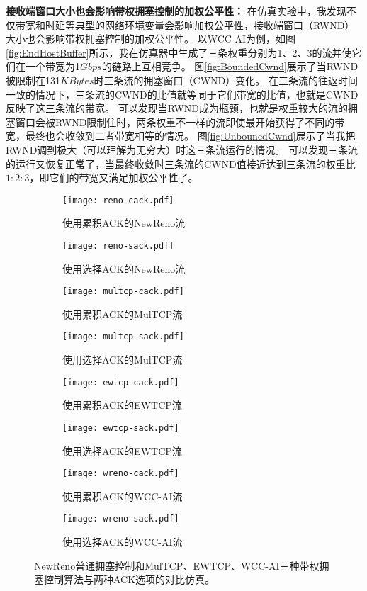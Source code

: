 \documentclass[winfonts]{njuthesis}
\begin{document}
\textbf{接收端窗口大小也会影响带权拥塞控制的加权公平性：}
在仿真实验中，我发现不仅带宽和时延等典型的网络环境变量会影响加权公平性，接收端窗口（RWND）大小也会影响带权拥塞控制的加权公平性。
以WCC-AI为例，如图\ref{fig:EndHostBuffer}所示，我在仿真器中生成了三条权重分别为1、2、3的流并使它们在一个带宽为1$Gbps$的链路上互相竞争。
图\ref{fig:BoundedCwnd}展示了当RWND被限制在131$KBytes$时三条流的拥塞窗口（CWND）变化。
在三条流的往返时间一致的情况下，三条流的CWND的比值就等同于它们带宽的比值，也就是CWND反映了这三条流的带宽。
可以发现当RWND成为瓶颈，也就是权重较大的流的拥塞窗口会被RWND限制住时，两条权重不一样的流即使最开始获得了不同的带宽，最终也会收敛到二者带宽相等的情况。
图\ref{fig:UnbounedCwnd}展示了当我把RWND调到极大（可以理解为无穷大）时这三条流运行的情况。
可以发现三条流的运行又恢复正常了，当最终收敛时三条流的CWND值接近达到三条流的权重比$1:2:3$，即它们的带宽又满足加权公平性了。

\begin{figure}[ht!]
	\begin{subfigure}{.5\textwidth}
    \centering
		\texttt{[image: reno-cack.pdf]}
    \label{fig:renoCack}
    \caption{使用累积ACK的NewReno流}
  \end{subfigure}
	\begin{subfigure}{.5\textwidth}
    \centering
		\texttt{[image: reno-sack.pdf]}
    \label{fig:renoSack}
    \caption{使用选择ACK的NewReno流}
  \end{subfigure}
	\begin{subfigure}{.5\textwidth}
    \centering
		\texttt{[image: multcp-cack.pdf]}
    \label{fig:multcpCack}
    \caption{使用累积ACK的MulTCP流}
  \end{subfigure}
	\begin{subfigure}{.5\textwidth}
    \centering
		\texttt{[image: multcp-sack.pdf]}
    \label{fig:multcpSack}
    \caption{使用选择ACK的MulTCP流}
  \end{subfigure}
	\begin{subfigure}{.5\textwidth}
    \centering
		\texttt{[image: ewtcp-cack.pdf]}
    \label{fig:ewtcpCack}
    \caption{使用累积ACK的EWTCP流}
  \end{subfigure}
	\begin{subfigure}{.5\textwidth}
    \centering
		\texttt{[image: ewtcp-sack.pdf]}
    \label{fig:ewtcpSack}
    \caption{使用选择ACK的EWTCP流}
  \end{subfigure}
	\begin{subfigure}{.5\textwidth}
    \centering
		\texttt{[image: wreno-cack.pdf]}
    \label{fig:wrenoCack}
    \caption{使用累积ACK的WCC-AI流}
  \end{subfigure}
	\begin{subfigure}{.5\textwidth}
    \centering
		\texttt{[image: wreno-sack.pdf]}
    \label{fig:wrenoSack}
    \caption{使用选择ACK的WCC-AI流}
  \end{subfigure}
	\caption{NewReno普通拥塞控制和MulTCP、EWTCP、WCC-AI三种带权拥塞控制算法与两种ACK选项的对比仿真。}
	\label{fig:CackSackDiff}
\end{figure}
\end{document}
